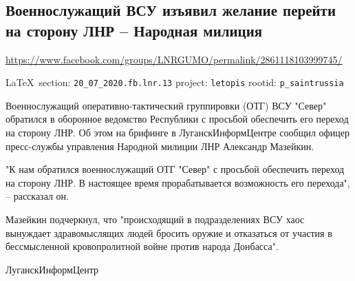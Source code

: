  
 

\subsection{Военнослужащий ВСУ изъявил желание перейти на сторону ЛНР – Народная милиция}
\url{https://www.facebook.com/groups/LNRGUMO/permalink/2861118103999745/}
  
\vspace{0.5cm}
{\small\LaTeX~section: \verb|20_07_2020.fb.lnr.13| project: \verb|letopis| rootid: \verb|p_saintrussia|}
\vspace{0.5cm}

Военнослужащий оперативно-тактический группировки (ОТГ) ВСУ "Север" обратился в
оборонное ведомство Республики с просьбой обеспечить его переход на сторону
ЛНР. Об этом на брифинге в ЛуганскИнформЦентре сообщил офицер пресс-службы
управления Народной милиции ЛНР Александр Мазейкин.

"К нам обратился военнослужащий ОТГ "Север" с просьбой обеспечить переход на
сторону ЛНР. В настоящее время прорабатывается возможность его перехода", –
рассказал он.

Мазейкин подчеркнул, что "происходящий в подразделениях ВСУ хаос вынуждает
здравомыслящих людей бросить оружие и отказаться от участия в бессмысленной
кровопролитной войне против народа Донбасса".

ЛуганскИнформЦентр
  
